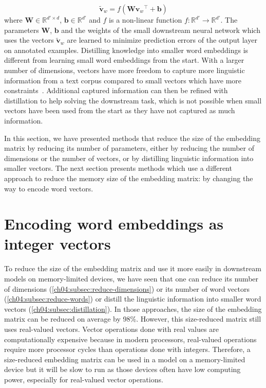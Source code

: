       \begin{equation}
        \widetilde{\mathbf{v}}_w = f(\mathbf{W} \mathbf{v}_w{}^\top
                                   + \mathbf{b})
      \end{equation}
      where $\mathbf{W} \in \mathbb{R}^{d' \times d}$, $\mathbf{b} \in
      \mathbb{R}^{d'}$ and $f$ is a non-linear function $f: \mathbb{R}^{d'} \to
      \mathbb{R}^{d'}$. The parameters $\mathbf{W}$, $\mathbf{b}$ and the
      weights of the small downstream neural network which uses the vectors
      $\widetilde{\mathbf{v}}_w$ are learned to minimize prediction errors of
      the output layer on annotated examples. Distilling knowledge into smaller
      word embeddings is different from learning small word embeddings from the
      start.  With a larger number of dimensions, vectors have more freedom to
      capture more linguistic information from a text corpus compared to small
      vectors which have more constraints~\citep{zi2018dimensionality}.
      Additional captured information can then be refined with distillation to
      help solving the downstream task, which is not possible when small vectors
      have been used from the start as they have not captured as much
      information.

    \medskip
    In this section, we have presented methods that reduce the size of the
    embedding matrix by reducing its number of parameters, either by reducing
    the number of dimensions or the number of vectors, or by distilling
    linguistic information into smaller vectors. The next section presents
    methods which use a different approach to reduce the memory size of the
    embedding matrix: by changing the way to encode word vectors.

\section{Encoding word embeddings as integer vectors}
  \label{ch04:sec:integer-vectors}
  To reduce the size of the embedding matrix and use it more easily in
  downstream models on memory-limited devices, we have seen that one can reduce
  its number of dimensions (\autoref{ch04:subsec:reduce-dimensions}) or its
  number of word vectors (\autoref{ch04:subsec:reduce-words}) or distill the
  linguistic information into smaller word vectors
  (\autoref{ch04:subsec:distillation}). In those approaches, the size of the
  embedding matrix can be reduced on average by 98\%. However, this size-reduced
  matrix still uses real-valued vectors. Vector operations done with real values
  are computationally expensive because in modern processors, real-valued
  operations require more processor cycles than operations done with integers.
  Therefore, a size-reduced embedding matrix can be used in a model on a
  memory-limited device but it will be slow to run as those devices often have
  low computing power, especially for real-valued vector operations.\medskip

